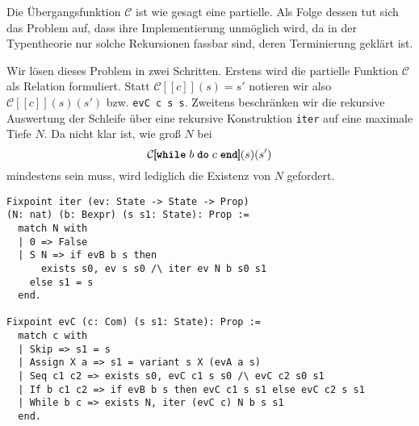 \documentclass[8pt,fleqn,aspectratio=169]{beamer}
\newcommand{\ttq}{\textquotesingle}
\newcommand{\parspace}{\vspace{0.8em}}
\newcommand{\kw}[1]{\textbf{\texttt{#1}}}
\newcommand{\code}[1]{{\texttt{#1}}}
\newcommand{\qb}[1]{[\!\![#1]\!\!]}
\newcommand{\evC}{\mathcal C}
\begin{document}
\begin{frame}
Die Übergangsfunktion $\evC$ ist wie gesagt eine partielle. Als Folge
dessen tut sich das Problem auf, dass ihre Implementierung unmöglich
wird, da in der Typentheorie nur solche Rekursionen fassbar
sind, deren Terminierung geklärt ist.

\parspace
Wir lösen dieses Problem in zwei Schritten. Erstens wird die partielle
Funktion $\evC$ als Relation formuliert. Statt $\evC\qb{c}(s)=s'$ notieren
wir also $\evC\qb{c}(s)(s')$ bzw. \code{evC c s s\ttq}. Zweitens beschränken
wir die rekursive Auswertung der Schleife über eine rekursive
Konstruktion \code{iter} auf eine maximale Tiefe $N$. Da nicht klar
ist, wie groß $N$ bei
\[\evC\qb{\kw{while}\; b\; \kw{do}\; c\; \kw{end}}(s)(s')\]
mindestens sein muss, wird lediglich die Existenz von $N$ gefordert.
\end{frame}

\begin{frame}[fragile]
\begin{lstlisting}[language=Coq, xleftmargin=\mathindent]
Fixpoint iter (ev: State -> State -> Prop)
(N: nat) (b: Bexpr) (s s1: State): Prop :=
  match N with
  | 0 => False
  | S N => if evB b s then
      exists s0, ev s s0 /\ iter ev N b s0 s1
    else s1 = s
  end.

Fixpoint evC (c: Com) (s s1: State): Prop :=
  match c with
  | Skip => s1 = s
  | Assign X a => s1 = variant s X (evA a s)
  | Seq c1 c2 => exists s0, evC c1 s s0 /\ evC c2 s0 s1
  | If b c1 c2 => if evB b s then evC c1 s s1 else evC c2 s s1
  | While b c => exists N, iter (evC c) N b s s1
  end.
\end{lstlisting}
\end{frame}
\end{document}
